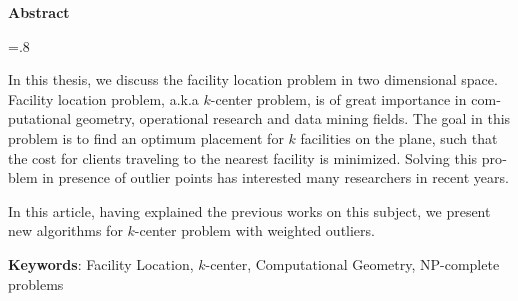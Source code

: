 


\pagestyle{empty}

\begin{latin}

\begin{center}
\textbf{Abstract}
\end{center}
\baselineskip=.8\baselineskip

In this thesis, we discuss the facility location problem in two dimensional space. Facility location problem, a.k.a $k$-center problem, is of great importance in computational geometry, operational research and data mining fields. The goal in this problem is to find an optimum placement for $k$ facilities on the plane, such that the cost for clients traveling to the nearest facility is minimized. Solving this problem in presence of outlier points has interested many researchers in recent years.

In this article, having explained the previous works on this subject, we present new algorithms for $k$-center problem with weighted outliers.


\bigskip\noindent\textbf{Keywords}:
Facility Location, $k$-center, Computational Geometry, NP-complete problems

\end{latin}

\newpage
